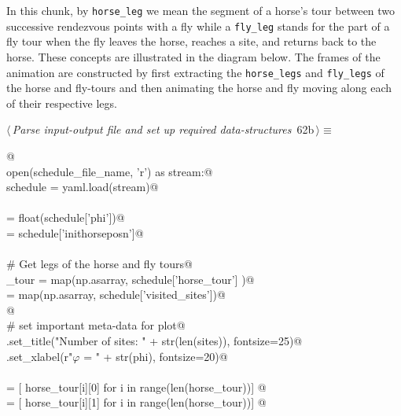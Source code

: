 \documentclass[11.5pt]{report}
\begin{document}
\vspace{-0.8cm} \newchunk In this chunk, by \verb|horse_leg| we mean the segment of a horse's 
tour between two successive rendezvous points with a fly while a \verb|fly_leg| stands for 
the part of a fly tour when the fly leaves the horse, reaches a site, and returns back to the horse. These
concepts are illustrated in the diagram below. The frames of the animation are constructed by first
extracting the \verb|horse_legs| and \verb|fly_legs| of the horse and fly-tours and then 
animating the horse and fly moving along each of their respective legs. 


\begin{flushleft} \small\label{scrap95}\raggedright\small
{} $\langle\,${\itshape Parse input-output file and set up required data-structures}\nobreak\ {\footnotesize {62b}}$\,\rangle\equiv$
\vspace{-1ex}
\begin{list}{}{} \item
\mbox{}\verb@   @\\
\mbox{}\verb@with open(schedule_file_name, 'r') as stream:@\\
\mbox{}\verb@      schedule = yaml.load(stream)@\\
\mbox{}\verb@@\\
\mbox{}\verb@phi           = float(schedule['phi'])@\\
\mbox{}\verb@inithorseposn = schedule['inithorseposn']@\\
\mbox{}\verb@@\\
\mbox{}\verb@# Get legs of the horse and fly tours@\\
\mbox{}\verb@horse_tour  = map(np.asarray, schedule['horse_tour']   )@\\
\mbox{}\verb@sites       = map(np.asarray, schedule['visited_sites'])@\\
\mbox{}\verb@           @\\
\mbox{}\verb@# set important meta-data for plot@\\
\mbox{}\verb@ax.set_title("Number of sites: " + str(len(sites)), fontsize=25)@\\
\mbox{}\verb@ax.set_xlabel(r"$\varphi$ = " + str(phi), fontsize=20)@\\
\mbox{}\verb@@\\
\mbox{}\verb@xhs = [ horse_tour[i][0] for i in range(len(horse_tour))]    @\\
\mbox{}\verb@yhs = [ horse_tour[i][1] for i in range(len(horse_tour))]    @\\

\end{list}
\end{flushleft}
\end{document}
